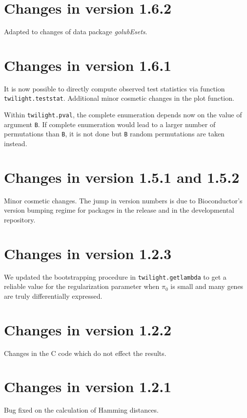 \documentclass[11pt,a4paper,fleqn]{report}
\newcommand{\Rfunction}[1]{{\texttt{#1}}}
\newcommand{\Rpackage}[1]{{\textit{#1}}}
\newcommand{\Rfunarg}[1]{{\texttt{#1}}}
\begin{document}
\section*{Changes in version 1.6.2}

Adapted to changes of data package \Rpackage{golubEsets}.


\section*{Changes in version 1.6.1}

It is now possible to directly compute observed test statistics via function \Rfunction{twilight.teststat}. Additional minor cosmetic changes in the plot function. 

Within \Rfunction{twilight.pval}, the complete enumeration depends now on the value of argument \Rfunarg{B}. If complete enumeration would lead to a larger number of permutations than \Rfunarg{B}, it is not done but \Rfunarg{B} random permutations are taken instead.


\section*{Changes in version 1.5.1 and 1.5.2}

Minor cosmetic changes. The jump in version numbers is due to Bioconductor's version bumping regime for packages in the release and in the developmental repository.


\section*{Changes in version 1.2.3}

We updated the bootstrapping procedure in \Rfunction{twilight.getlambda} to get a reliable value for the regularization parameter when $\pi_0$ is small and many genes are truly differentially expressed.


\section*{Changes in version 1.2.2}

Changes in the C code which do not effect the results.


\section*{Changes in version 1.2.1}

Bug fixed on the calculation of Hamming distances.
\end{document}

